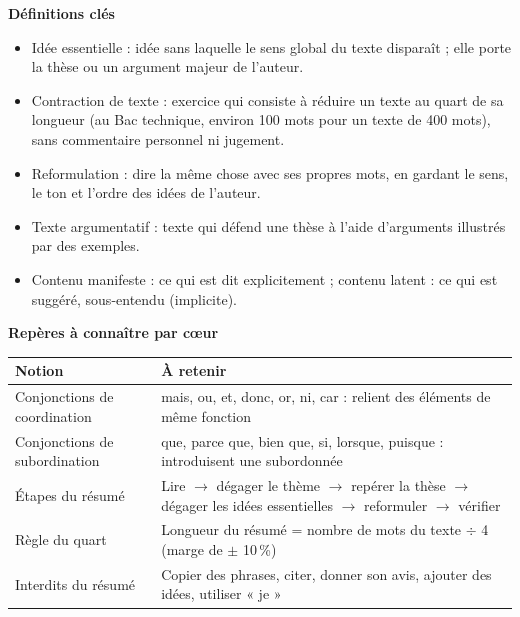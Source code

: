 \documentclass[11pt]{article}
\newcommand{\cle}[1]{{\popxbold\color{popdark}#1}}
\begin{document}
\begin{bilan}
\textbf{Définitions clés}
\begin{itemize}
\item \cle{Idée essentielle} : idée sans laquelle le sens global du texte disparaît ; elle porte la thèse ou un argument majeur de l'auteur.
\item \cle{Contraction de texte} : exercice qui consiste à réduire un texte au quart de sa longueur (au Bac technique, environ 100 mots pour un texte de 400 mots), sans commentaire personnel ni jugement.
\item \cle{Reformulation} : dire la même chose avec ses propres mots, en gardant le sens, le ton et l'ordre des idées de l'auteur.
\item \cle{Texte argumentatif} : texte qui défend une \cle{thèse} à l'aide d'\cle{arguments} illustrés par des \cle{exemples}.
\item \cle{Contenu manifeste} : ce qui est dit explicitement ; \cle{contenu latent} : ce qui est suggéré, sous-entendu (implicite).
\end{itemize}

\textbf{Repères à connaître par cœur}
\begin{center}
\begin{tabularx}{\linewidth}{|l|X|}\hline
\rowcolor{popblueL} Notion & À retenir \\ \hline
Conjonctions de coordination & mais, ou, et, donc, or, ni, car : relient des éléments de même fonction \\ \hline
Conjonctions de subordination & que, parce que, bien que, si, lorsque, puisque : introduisent une subordonnée \\ \hline
Étapes du résumé & Lire $\rightarrow$ dégager le thème $\rightarrow$ repérer la thèse $\rightarrow$ dégager les idées essentielles $\rightarrow$ reformuler $\rightarrow$ vérifier \\ \hline
Règle du quart & Longueur du résumé = nombre de mots du texte $\div$ 4 (marge de $\pm$ 10\,\%) \\ \hline
Interdits du résumé & Copier des phrases, citer, donner son avis, ajouter des idées, utiliser « je » \\ \hline
\end{tabularx}
\end{center}


\end{bilan}
\end{document}
